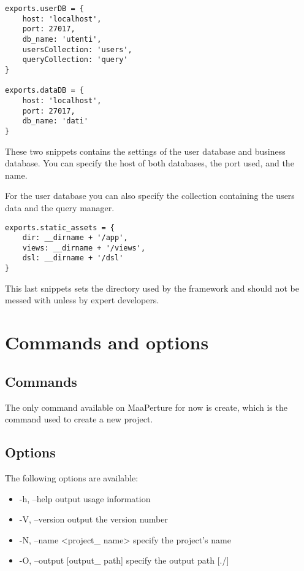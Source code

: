\begin{verbatim}
exports.userDB = {
	host: 'localhost',
	port: 27017,
	db_name: 'utenti',
	usersCollection: 'users',
	queryCollection: 'query'
}

exports.dataDB = {
	host: 'localhost',
	port: 27017,
	db_name: 'dati'
}
\end{verbatim}

These two snippets contains the settings of the user database and business database.
You can specify the host of both databases, the port used, and the name.

For the user database you can also specify the collection containing the users data and the query manager.


\begin{verbatim}
exports.static_assets = {
	dir: __dirname + '/app',
	views: __dirname + '/views',
	dsl: __dirname + '/dsl'
}
\end{verbatim}

This last snippets sets the directory used by the framework and should not be messed with unless by expert developers.


\section{Commands and options}

\subsection{Commands}
\label{commands}
The only command available on MaaPerture for now is create, which is the command used to create a new project.

\subsection{Options}
\label{options}
The following options are available:
\begin{itemize}
\item -h, --help                  output usage information
\item -V, --version               output the version number
\item -N, --name <project\_ name>   specify the project's name
\item -O, --output [output\_ path]  specify the output path [./]
\end{itemize}


